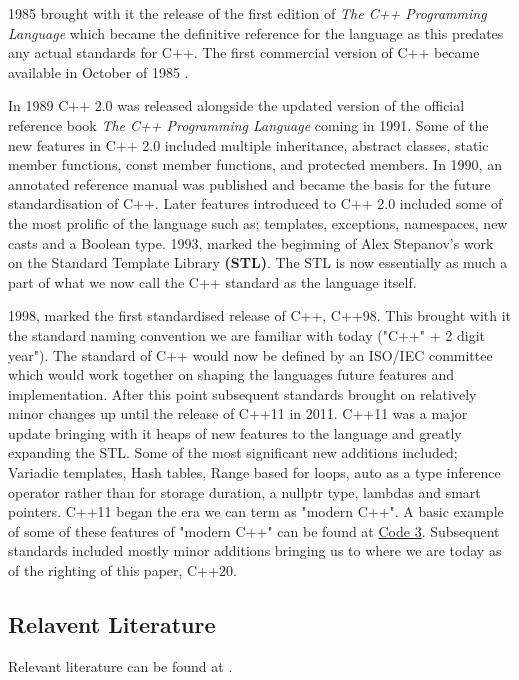 \documentclass[conference, a4paper]{IEEEtran}
\begin{document}
1985 brought with it the release of the first edition of \textit{The C++ Programming Language} \cite{cpp_1985} which became the definitive reference for the language as this predates any actual standards for C++. The first commercial version of C++ became available in October of 1985 \cite{cppinvention}.

In 1989 C++ 2.0 was released alongside the updated version of the official reference book \textit{The C++ Programming Language} coming in 1991. Some of the new features in C++ 2.0 included multiple inheritance, abstract classes, static member functions, const member functions, and protected members. In 1990, an annotated reference manual was published and became the basis for the future standardisation of C++. Later features introduced to C++ 2.0 included some of the most prolific of the language such as; templates, exceptions, namespaces, new casts and a Boolean type. 1993, marked the beginning of Alex Stepanov's work on the Standard Template Library \textbf{(STL)}. The STL is now essentially as much a part of what we now call the C++ standard as the language itself. 

1998, marked the first standardised release of C++, C++98. This brought with it the standard naming convention we are familiar with today ("C++" + 2 digit year"). The standard of C++ would now be defined by an ISO/IEC committee which would work together on shaping the languages future features and implementation. After this point subsequent standards brought on relatively minor changes up until the release of C++11 in 2011. C++11 was a major update bringing with it heaps of new features to the language and greatly expanding the STL. Some of the most significant new additions included; Variadic templates, Hash tables, Range based for loops, auto as a type inference operator rather than for storage duration, a nullptr type, lambdas and smart pointers. C++11 began the era we can term as "modern C++". A basic example of some of these features of "modern C++" can be found at \hyperref[listing:3]{Code 3}. Subsequent standards included mostly minor additions bringing us to where we are today as of the righting of this paper, C++20.


\subsection{Relavent Literature}
Relevant literature can be found at \cite{cpphome,cpp_1985,cpphistory,cppoverview,cppevolving,josuttis2012c++,alexandrescu2001modern}.
\end{document}
